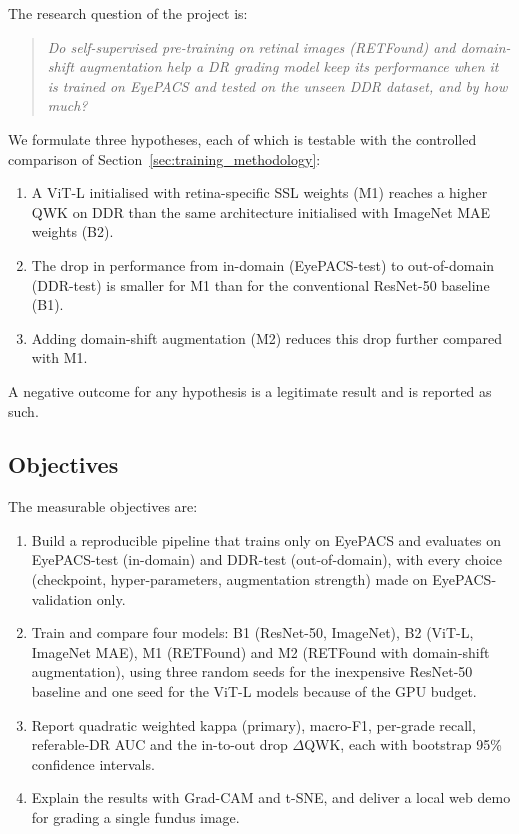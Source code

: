The research question of the project is:

\begin{quote}
\emph{Do self-supervised pre-training on retinal images (RETFound) and domain-shift augmentation help a DR grading model keep its performance when it is trained on EyePACS and tested on the unseen DDR dataset, and by how much?}
\end{quote}

We formulate three hypotheses, each of which is testable with the controlled comparison of Section~\ref{sec:training_methodology}:

\begin{enumerate}[leftmargin=1.8em]
    \item[H1.] A ViT-L initialised with retina-specific SSL weights (M1) reaches a higher QWK on DDR than the same architecture initialised with ImageNet MAE weights (B2).
    \item[H2.] The drop in performance from in-domain (EyePACS-test) to out-of-domain (DDR-test) is smaller for M1 than for the conventional ResNet-50 baseline (B1).
    \item[H3.] Adding domain-shift augmentation (M2) reduces this drop further compared with M1.
\end{enumerate}

A negative outcome for any hypothesis is a legitimate result and is reported as such.

\subsection{Objectives}
\label{subsec:objectives}

The measurable objectives are:

\begin{enumerate}[leftmargin=1.8em]
    \item Build a reproducible pipeline that trains only on EyePACS and evaluates on EyePACS-test (in-domain) and DDR-test (out-of-domain), with every choice (checkpoint, hyper-parameters, augmentation strength) made on EyePACS-validation only.
    \item Train and compare four models: B1 (ResNet-50, ImageNet), B2 (ViT-L, ImageNet MAE), M1 (RETFound) and M2 (RETFound with domain-shift augmentation), using three random seeds for the inexpensive ResNet-50 baseline and one seed for the ViT-L models because of the GPU budget.
    \item Report quadratic weighted kappa (primary), macro-F1, per-grade recall, referable-DR AUC and the in-to-out drop $\Delta$QWK, each with bootstrap 95\% confidence intervals.
    \item Explain the results with Grad-CAM and t-SNE, and deliver a local web demo for grading a single fundus image.
\end{enumerate}

